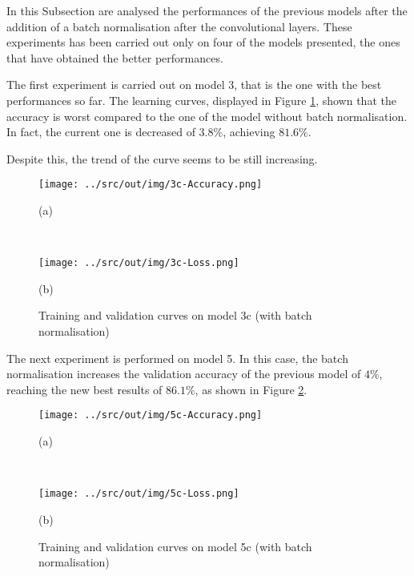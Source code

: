 \documentclass[a4paper,12pt]{article} %
\begin{document}
	In this Subsection are analysed the performances of the previous models 
	after the addition of a batch normalisation after the convolutional layers. 
	These experiments has been carried out only on four of the models 
	presented, the ones that have obtained the better performances.
	\newline
	
	The first experiment is carried out on model 3, that is the one with the 
	best performances so far. The learning curves, displayed in Figure 
	\ref{fig:model3c-performance}, shown that the accuracy is worst compared to 
	the one of the model without batch normalisation. In fact, the current one 
	is decreased of $3.8\%$, achieving $81.6\%$. %
	
	Despite this, the trend of the curve seems to be still increasing.

	\begin{figure}[htb]
		\begin{minipage}[c]{.49\textwidth}
			\centering
			\texttt{[image: ../src/out/img/3c-Accuracy.png]}
			\caption*{(a)}
		\end{minipage}
		~
		\begin{minipage}[c]{.49\textwidth}
			\centering
			\texttt{[image: ../src/out/img/3c-Loss.png]}
			\caption*{(b)}
		\end{minipage}
		\caption{Training and validation curves on model 3c (with batch 
		normalisation)}
		\label{fig:model3c-performance}
	\end{figure}
	
	The next experiment is performed on model 5. In this case, the batch 
	normalisation increases the validation accuracy of the previous model of 
	$4\%$, reaching the new best results of $86.1\%$, as shown in Figure 
	\ref{fig:model5c-performance}.
	
	\begin{figure}[htb]
		\begin{minipage}[c]{.49\textwidth}
			\centering
			\texttt{[image: ../src/out/img/5c-Accuracy.png]}
			\caption*{(a)}
		\end{minipage}
		~
		\begin{minipage}[c]{.49\textwidth}
			\centering
			\texttt{[image: ../src/out/img/5c-Loss.png]}
			\caption*{(b)}
		\end{minipage}
		\caption{Training and validation curves on model 5c (with batch 
			normalisation)}
		\label{fig:model5c-performance}
	\end{figure}
	
\end{document}
